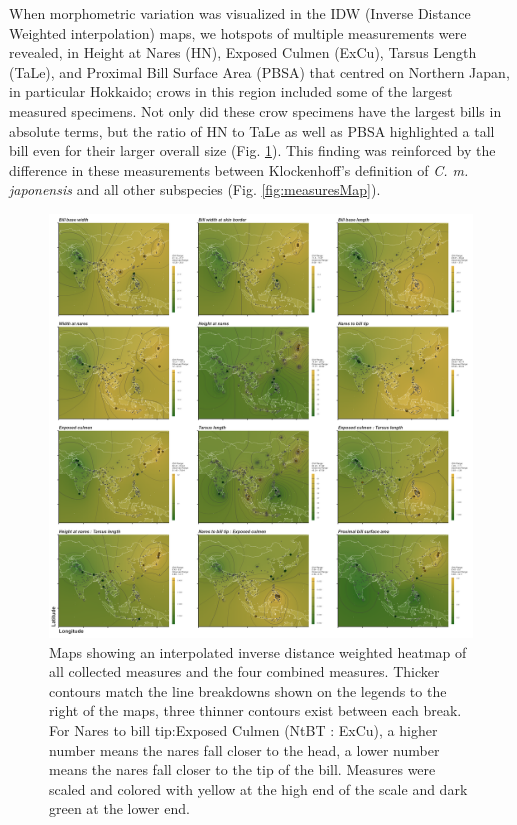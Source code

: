 \documentclass[10pt,a4paper]{article}
\begin{document}
When morphometric variation was visualized in the IDW (Inverse Distance Weighted interpolation) maps, we hotspots of multiple measurements were revealed, in Height at Nares (HN), Exposed Culmen (ExCu), Tarsus Length (TaLe), and Proximal Bill Surface Area (PBSA) that centred on Northern Japan, in particular Hokkaido; crows in this region included some of the largest measured specimens.
Not only did these crow specimens have the largest bills in absolute terms, but the ratio of HN to TaLe as well as PBSA highlighted a tall bill even for their larger overall size (Fig. \ref{fig:idwMaps}).
This finding was reinforced by the difference in these measurements between Klockenhoff's definition of \emph{C. m. japonensis} and all other subspecies (Fig. \ref{fig:measuresMap}).

\begin{figure}
\includegraphics[width=0.9\linewidth]{../Figures/IDWmaps} \caption{Maps showing an interpolated inverse distance weighted heatmap of all collected measures and the four combined measures. Thicker contours match the line breakdowns shown on the legends to the right of the maps, three thinner contours exist between each break. For Nares to bill tip:Exposed Culmen (NtBT : ExCu), a higher number means the nares fall closer to the head, a lower number means the nares fall closer to the tip of the bill. Measures were scaled and colored with yellow at the high end of the scale and dark green at the lower end.}\label{fig:idwMaps}
\end{figure}
\end{document}
